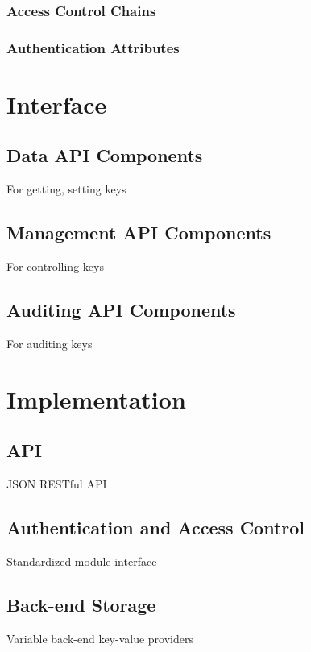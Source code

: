 \subsubsection{Access Control Chains}


\subsubsection{Authentication Attributes}


\section{Interface}

\subsection{Data API Components}

For getting, setting keys

\subsection{Management API Components}

For controlling keys

\subsection{Auditing API Components}

For auditing  keys

\section{Implementation}

\subsection{API}

JSON RESTful API

\subsection{Authentication and Access Control}

Standardized module interface

\subsection{Back-end Storage}

Variable back-end key-value providers

